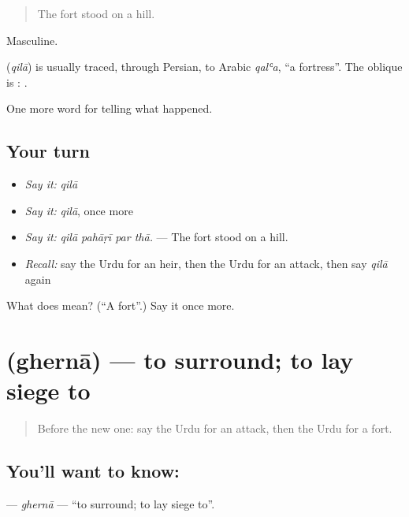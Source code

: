 \begin{quote}
The fort stood on a hill.
\end{quote}

Masculine.

\begin{cousinweb}
\textbf{} (\emph{qilā}) is usually traced, through Persian, to Arabic \emph{qalʿa}, \textquotedblleft{}a fortress\textquotedblright{}. The oblique is \textbf{}: \textbf{ }.
\end{cousinweb}

\begin{grammarlens}[title={What you've built}]
One more word for telling what happened.
\end{grammarlens}

\subsection*{Your turn}
\begin{itemize}
\raggedright
  \item \emph{Say it:} \emph{qilā}
  \item \emph{Say it:} \emph{qilā}, once more
  \item \emph{Say it:} \emph{qilā pahāṛī par thā.} — The fort stood on a hill.
  \item \emph{Recall:} say the Urdu for an heir, then the Urdu for an attack, then say \emph{qilā} again
\end{itemize}

\begin{tcolorbox}[breakable,colback=teal!4,colframe=teal!35!black,title={Before you move on}]
What does  mean? (\textquotedblleft{}A fort\textquotedblright{}.) Say it once more.
\end{tcolorbox}
\section[\texorpdfstring{\ur{گھیرنا} (ghernā)}{گھیرنا (ghernā)}]{ (ghernā) — to surround; to lay siege to}

\label{lesson:UR-C309-gherna}



\begin{quote}
Before the new one: say the Urdu for an attack, then the Urdu for a fort.
\end{quote}

\subsection*{You'll want to know: }
\textbf{} — \emph{ghernā} — \textquotedblleft{}to surround; to lay siege to\textquotedblright{}.

